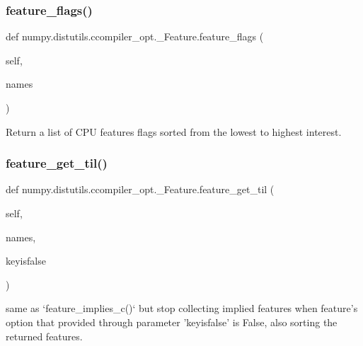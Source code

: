 \subsubsection{\texorpdfstring{feature\+\_\+flags()}{feature\_flags()}}
{\footnotesize\ttfamily def numpy.\+distutils.\+ccompiler\+\_\+opt.\+\_\+\+Feature.\+feature\+\_\+flags (\begin{DoxyParamCaption}\item[{}]{self,  }\item[{}]{names }\end{DoxyParamCaption})}

\begin{DoxyVerb}Return a list of CPU features flags sorted from the lowest
to highest interest.
\end{DoxyVerb}
 \mbox{\label{classnumpy_1_1distutils_1_1ccompiler__opt_1_1__Feature_a0193863be451726b816f51e8f8bce067}} 
\subsubsection{\texorpdfstring{feature\+\_\+get\+\_\+til()}{feature\_get\_til()}}
{\footnotesize\ttfamily def numpy.\+distutils.\+ccompiler\+\_\+opt.\+\_\+\+Feature.\+feature\+\_\+get\+\_\+til (\begin{DoxyParamCaption}\item[{}]{self,  }\item[{}]{names,  }\item[{}]{keyisfalse }\end{DoxyParamCaption})}

\begin{DoxyVerb}same as `feature_implies_c()` but stop collecting implied
features when feature's option that provided through
parameter 'keyisfalse' is False, also sorting the returned
features.
\end{DoxyVerb}
 \mbox{\label{classnumpy_1_1distutils_1_1ccompiler__opt_1_1__Feature_a326853cdc7f2baf4945e37946075a5d8}} 
